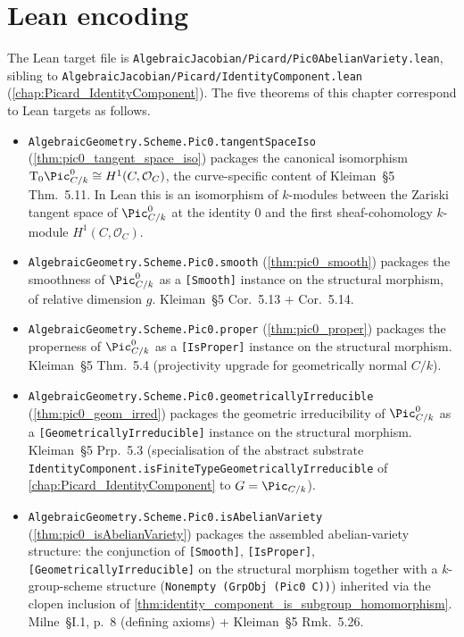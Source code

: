 \section{Lean encoding}
\label{sec:pic0_isAbelianVariety_lean_encoding}

The Lean target file is
\texttt{AlgebraicJacobian/Picard/Pic0AbelianVariety.lean}, sibling to
\texttt{AlgebraicJacobian/Picard/IdentityComponent.lean}
(\cref{chap:Picard_IdentityComponent}). The five theorems of this
chapter correspond to Lean targets as follows.

\begin{itemize}
  \item \texttt{AlgebraicGeometry.Scheme.Pic0.tangentSpaceIso}
    (\cref{thm:pic0_tangent_space_iso}) packages the canonical
    isomorphism
    \(\tu T_0 \Pic^0_{C/k} \cong H^1(C, \mathcal{O}_C)\), the
    curve-specific content of Kleiman~\S 5 Thm.~5.11. In Lean
    this is an isomorphism of \(k\)-modules between the Zariski
    tangent space of \(\Pic^0_{C/k}\) at the identity \(0\) and the
    first sheaf-cohomology \(k\)-module \(H^1(C, \mathcal{O}_C)\).
  \item \texttt{AlgebraicGeometry.Scheme.Pic0.smooth}
    (\cref{thm:pic0_smooth}) packages the smoothness of
    \(\Pic^0_{C/k}\) as a \texttt{[Smooth]} instance on the structural
    morphism, of relative dimension \(g\). Kleiman~\S 5
    Cor.~5.13 + Cor.~5.14.
  \item \texttt{AlgebraicGeometry.Scheme.Pic0.proper}
    (\cref{thm:pic0_proper}) packages the properness of
    \(\Pic^0_{C/k}\) as a \texttt{[IsProper]} instance on the
    structural morphism. Kleiman~\S 5 Thm.~5.4 (projectivity
    upgrade for geometrically normal \(C/k\)).
  \item \texttt{AlgebraicGeometry.Scheme.Pic0.geometricallyIrreducible}
    (\cref{thm:pic0_geom_irred}) packages the geometric
    irreducibility of \(\Pic^0_{C/k}\) as a
    \texttt{[GeometricallyIrreducible]} instance on the structural
    morphism. Kleiman~\S 5 Prp.~5.3 (specialisation of the
    abstract substrate
    \texttt{IdentityComponent.isFiniteTypeGeometricallyIrreducible}
    of \cref{chap:Picard_IdentityComponent} to \(G = \Pic_{C/k}\)).
  \item \texttt{AlgebraicGeometry.Scheme.Pic0.isAbelianVariety}
    (\cref{thm:pic0_isAbelianVariety}) packages the assembled
    abelian-variety structure: the conjunction of \texttt{[Smooth]},
    \texttt{[IsProper]}, \texttt{[GeometricallyIrreducible]} on the
    structural morphism together with a \(k\)-group-scheme structure
    (\texttt{Nonempty (GrpObj (Pic0 C))}) inherited via the clopen
    inclusion of \cref{thm:identity_component_is_subgroup_homomorphism}.
    Milne~\S I.1, p.~8 (defining axioms) + Kleiman~\S 5
    Rmk.~5.26.
\end{itemize}

